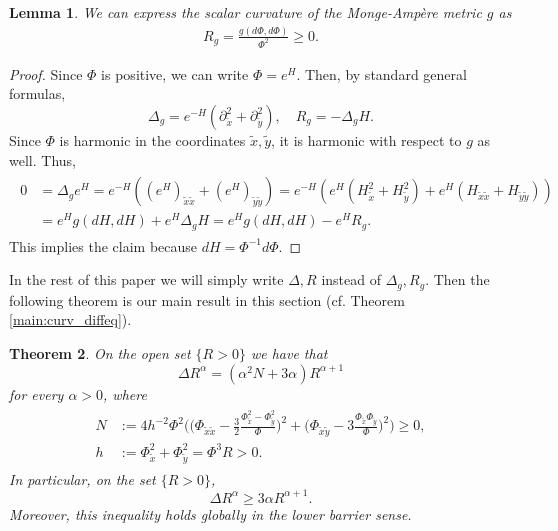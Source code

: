 \documentclass[11pt,reqno]{amsart}
\renewcommand{\geq}{\geqslant}
\theoremstyle{plain}
\newtheorem{theorem}{Theorem}[section]
\newtheorem{lemma}[theorem]{Lemma}
\theoremstyle{definition}
\numberwithin{equation}{section}
\begin{document}
\begin{lemma} \label{GC}
We can express the scalar curvature of the Monge-Ampère metric $g$ as
\begin{align*}
    R_g=\frac{g(d\Phi,d \Phi)}{\Phi^2}\geq0.
\end{align*}
\end{lemma}

\begin{proof}
Since $\Phi$ is positive, we can write $\Phi=e^{H}$. Then, by standard general formulas,
\begin{equation}\label{LBO+CHh}
    \Delta_g=e^{-H}(\partial_{\tilde{x}}^2+\partial_{\tilde{y}}^2), \quad R_g=-\Delta_g H.
\end{equation}
Since $\Phi$ is harmonic in the coordinates $\tilde{x},\tilde{y}$, it is harmonic with respect to $g$ as well. Thus,
\begin{align*}\begin{split}
0 &= \Delta_g e^{H} =  e^{-H}((e^{H})_{\tilde{x}\tilde{x}}+ (e^{H})_{\tilde{y}\tilde{y}})= e^{-H}(e^{H}(H_{\tilde{x}}^2+H_{\tilde{y}}^2) + e^{H}(H_{\tilde{x}\tilde{x}}+H_{\tilde{y}\tilde{y}})) \\
& = e^{H}g(dH, dH) +e^{H}\Delta_g H = e^{H}g(dH, dH) -e^{H}R_g.
\end{split}\end{align*}
This implies the claim because $dH = \Phi^{-1}d\Phi$.
\end{proof}

In the rest of this paper we will simply write $\Delta, R$ instead of $\Delta_g, R_g$. Then the following theorem is our main result in this section (cf. Theorem \ref{main:curv_diffeq}).

\begin{theorem}\label{alpha>0}
On the open set $\{R>0\}$ we have that
$$\Delta R^{\alpha}= (\alpha^2N+3\alpha)R^{\alpha+1}$$
for every $\alpha > 0$, where
\begin{align*}\begin{split}N&:=4h^{-2}\Phi^2\biggl(\biggl(\Phi_{\tilde{x}\tilde{x}}-\frac{3}{2}\frac{\Phi_{\tilde{x}}^2-\Phi_{\tilde{y}}^2}{\Phi}\biggr)^2+\biggl(\Phi_{\tilde{x}\tilde{y}}-3\frac{\Phi_{\tilde{x}}\Phi_{\tilde{y}}}{\Phi}\biggr)^2\biggr)\geq0,\\
h&:= \Phi_{\tilde{x}}^2+\Phi_{\tilde{y}}^2 = \Phi^3 R > 0.\end{split}\end{align*}
In particular, on the set $\{R > 0\}$,
$$\Delta R^{\alpha}\geq 3\alpha R^{\alpha+1}.$$
Moreover, this inequality holds globally in the lower barrier sense.
\end{theorem}
\end{document}
